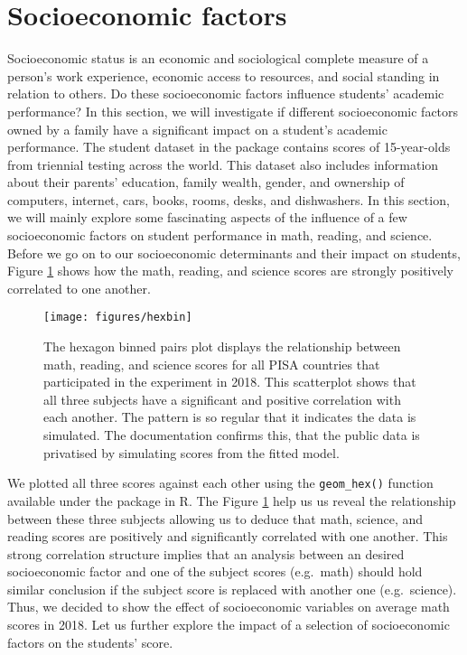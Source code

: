 \section{Socioeconomic factors}\label{socioeconomic-factors}

Socioeconomic status is an economic and sociological complete measure of a person's work experience, economic access to resources, and social standing in relation to others. Do these socioeconomic factors influence students' academic performance? In this section, we will investigate if different socioeconomic factors owned by a family have a significant impact on a student's academic performance. The student dataset in the  package contains scores of 15-year-olds from triennial testing across the world. This dataset also includes information about their parents' education, family wealth, gender, and ownership of computers, internet, cars, books, rooms, desks, and dishwashers. In this section, we will mainly explore some fascinating aspects of the influence of a few socioeconomic factors on student performance in math, reading, and science. Before we go on to our socioeconomic determinants and their impact on students, Figure \ref{fig:corr-plot} shows how the math, reading, and science scores are strongly positively correlated to one another.

\begin{figure}[H]
\texttt{[image: figures/hexbin]} \caption{The hexagon binned pairs plot displays the relationship between math, reading, and science scores for all PISA countries that participated in the experiment in 2018. This scatterplot shows that all three subjects have a significant and positive correlation with each another. The pattern is so regular that it indicates the data is simulated. The documentation confirms this, that the public data is privatised by simulating scores from the fitted model.}\label{fig:corr-plot}
\end{figure}

We plotted all three scores against each other using the \texttt{geom\_hex()} function available under the  \citep{ggplot2} package in R. The Figure \ref{fig:corr-plot} help us us reveal the relationship between these three subjects allowing us to deduce that math, science, and reading scores are positively and significantly correlated with one another. This strong correlation structure implies that an analysis between an desired socioeconomic factor and one of the subject scores (e.g.~math) should hold similar conclusion if the subject score is replaced with another one (e.g.~science). Thus, we decided to show the effect of socioeconomic variables on average math scores in 2018. Let us further explore the impact of a selection of socioeconomic factors on the students' score.


